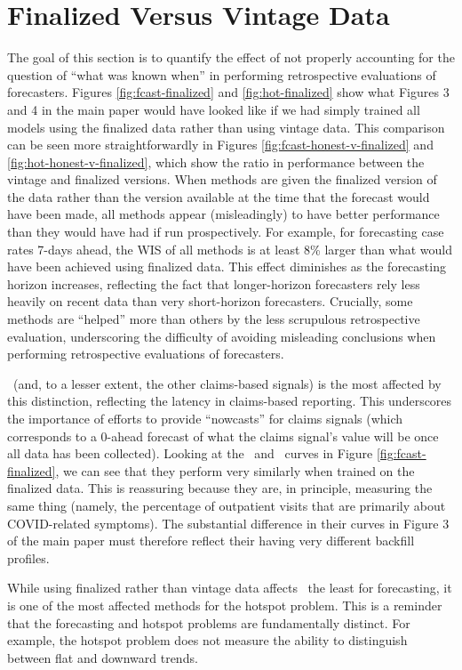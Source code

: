 \section{Finalized Versus Vintage Data}

The goal of this section is to quantify the effect of not properly accounting
for the question of ``what was known when'' in performing retrospective
evaluations of forecasters.  Figures \ref{fig:fcast-finalized} and
\ref{fig:hot-finalized} show what Figures 3 and 4 in the main paper would have
looked like if we had simply trained all models using the finalized data rather
than using vintage data.  This comparison can be seen more straightforwardly in
Figures \ref{fig:fcast-honest-v-finalized} and \ref{fig:hot-honest-v-finalized},
which show the ratio in performance between the vintage and finalized versions.
When methods are given the finalized version of the data rather than the version
available at the time that the forecast would have been made, all methods appear
(misleadingly) to have better performance than they would have had if run
prospectively.  For example, for forecasting case rates 7-days ahead, the WIS of
all methods is at least 8\% larger than what would have been achieved using
finalized data.  This effect diminishes as the forecasting horizon increases,
reflecting the fact that longer-horizon forecasters rely less heavily on recent
data than very short-horizon forecasters.  Crucially, some methods are
``helped'' more than others by the less scrupulous retrospective evaluation,
underscoring the difficulty of avoiding misleading conclusions when performing
retrospective evaluations of forecasters.

\chngcli~(and, to a lesser extent, the other claims-based signals) is the most
affected by this distinction, reflecting the latency in claims-based reporting.
This underscores the importance of efforts to provide ``nowcasts'' for claims
signals (which corresponds to a 0-ahead forecast of what the claims signal's
value will be once all data has been collected). Looking at the \chngcli~and
\dv~curves in Figure \ref{fig:fcast-finalized}, we can see that they perform
very similarly when trained on the finalized data.  This is reassuring because
they are, in principle, measuring the same thing (namely, the percentage of
outpatient visits that are primarily about COVID-related symptoms).  The
substantial difference in their curves in Figure 3 of the main paper must
therefore reflect their having very different backfill profiles.
  
While using finalized rather than vintage data affects \dv~the least for
forecasting, it is one of the most affected methods for the hotspot problem.
This is a reminder that the forecasting and hotspot problems are fundamentally
distinct.  For example, the hotspot problem does not measure the ability to
distinguish between flat and downward trends.

